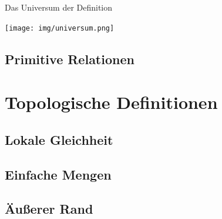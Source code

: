 \documentclass[10pt,xcolor={dvipsnames}]{beamer}
\begin{document}

\begin{frame}{Das Universum der \strukt}{Definition}
\begin{center}
    \texttt{[image: img/universum.png]}
\end{center}
\end{frame}

\subsection{Primitive Relationen}

\section{Topologische Definitionen}
\subsection{Lokale Gleichheit}
\subsection{Einfache Mengen}
\subsection{Äußerer Rand}
\end{document}
